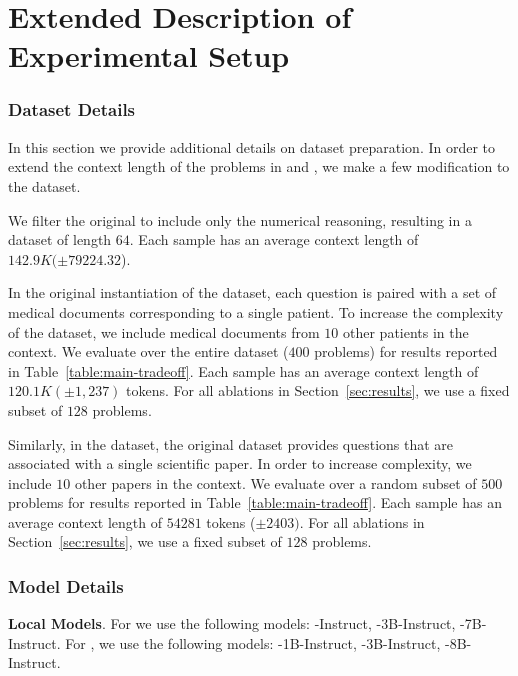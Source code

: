 \section{Extended Description of Experimental Setup}
\label{app:experiments}
\subsubsection{Dataset Details}
\label{app:experiments-dataset}

In this section we provide additional details on dataset preparation. In order to extend the context length of the problems in \longhealth and \qasper, we make a few modification to the dataset.

\textbf{\finance} We filter the original \finance to include only the numerical reasoning, resulting in a dataset of length $64$. Each sample has an average context length of $142.9K (\pm 79224.32$).

\textbf{\longhealth}
In the original instantiation of the \longhealth dataset, each question is paired with a set of medical documents corresponding to a single patient. To increase the complexity of the dataset, we include medical documents from $10$ other patients in the context. We evaluate over the entire dataset ($400$ problems) for results reported in Table~\ref{table:main-tradeoff}. Each sample has an average context length of $120.1K (\pm 1,237)$ tokens. For all ablations in Section~\ref{sec:results}, we use a fixed subset of $128$ problems. 

\textbf{\qasper} Similarly, in the \qasper dataset, the original dataset provides questions that are associated with a single scientific paper. In order to increase complexity, we include $10$ other papers in the context.  We evaluate over a random subset of $500$ problems for results reported in Table~\ref{table:main-tradeoff}. Each sample has an average context length of $54281$ tokens ($\pm 2403)$. For all ablations in Section~\ref{sec:results}, we use a fixed subset of $128$ problems.



\subsubsection{Model Details}
\label{app:experiments-models}
\textbf{Local Models}. For \qwen we use the following models: -Instruct, \qwen-3B-Instruct, \qwen-7B-Instruct. For \llama, we use the following models: \llamathreetwo-1B-Instruct, \llamathreetwo-3B-Instruct, -8B-Instruct.

